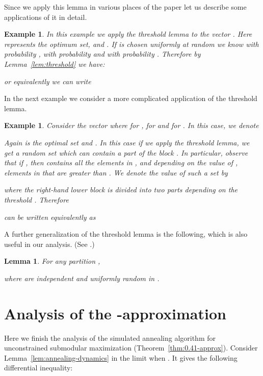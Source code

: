 \documentclass{article}[11pt]
\newtheorem{lemma}[theorem]{Lemma}
\newtheorem{example}[theorem]{Example}
\begin{document}
Since we apply this lemma in various places of the paper let us describe
some applications of it in detail.

\begin{example}
In this example we apply the threshold lemma to the vector .
Here  represents the optimum set,   and .
If  is chosen uniformly at random  we know 
with probability ,  with probability 
and  with probability . Therefore by Lemma~\ref{lem:threshold} we have:

or equivalently we can write

\end{example}

In the next example we consider a more complicated application of the threshold lemma.
\begin{example}
Consider the vector   where  for  ,  for  and  for . In this case, we denote

Again  is the optimal set and . In this case if we apply the threshold lemma,
we get a random set which can contain a part of the block .
In particular, observe that if , then  contains all the
elements in , and depending on the value of ,  elements in  that are greater than . We denote the value of such a set by 

where the right-hand lower block is divided into two parts depending on the threshold .
Therefore 

can be written equivalently as

\end{example}


A further generalization of the threshold lemma is the following, which is also useful
in our analysis. (See \cite[Lemma A.5]{Vondrak09}.)

\begin{lemma}
\label{lem:threshold2}
For any partition ,

where  are independent and uniformly random in .
\end{lemma}



\section{Analysis of the -approximation}
\label{app:unconstrained}

Here we finish the analysis of the simulated annealing algorithm
for unconstrained submodular maximization (Theorem~\ref{thm:0.41-approx}).
Consider Lemma~\ref{lem:annealing-dynamics} in the limit when .
It gives the following differential inequality:
\end{document}
